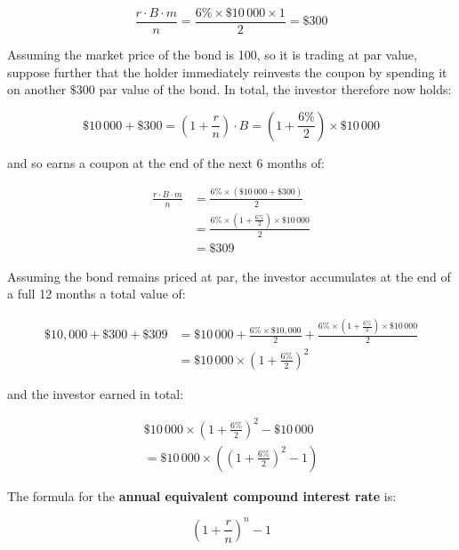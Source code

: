 $$\frac {r \cdot B \cdot m}{n} = \frac {6\% \times \$10\,000 \times 1}{2} = \$300$$



Assuming the market price of the bond is 100, so it is trading at par value, suppose
further that the holder immediately reinvests the coupon by spending it on another
$\text{\$}$300 par value of the bond. In total, the investor therefore now holds:



$$\$10\,000 + \$300 = \left(1 + \frac{r}{n}\right) \cdot B = \left(1 + \frac{6\%}{2}\right) \times \$10\,000$$



and so earns a coupon at the end of the next 6 months of:



\begin{align}\frac {r \cdot B \cdot m}{n} & = \frac {6\% \times \left(\$10\,000 + \$300\right)}{2} \\ & = \frac {6\% \times \left(1 + \frac{6\%}{2}\right) \times \$10\,000}{2} \\ & = \$309\end{align}



Assuming the bond remains priced at par, the investor accumulates at the end of a full 12
months a total value of:



\begin{align}\$10,000 + \$300 + \$309 & = \$10\,000 + \frac {6\% \times \$10,000}{2} + \frac {6\% \times \left( 1 + \frac {6\%}{2}\right) \times \$10\,000}{2} \\ & = \$10\,000 \times \left(1 + \frac{6\%}{2}\right)^2\end{align}



and the investor earned in total:



\begin{align}\$10\,000 \times \left(1 + \frac {6\%}{2}\right)^2 - \$10\,000 \\ = \$10\,000 \times \left( \left( 1 + \frac {6\%}{2}\right)^2 - 1\right)\end{align}



The formula for the \textbf{annual equivalent compound interest rate} is:



$$\left(1 + \frac{r}{n}\right)^n - 1$$



